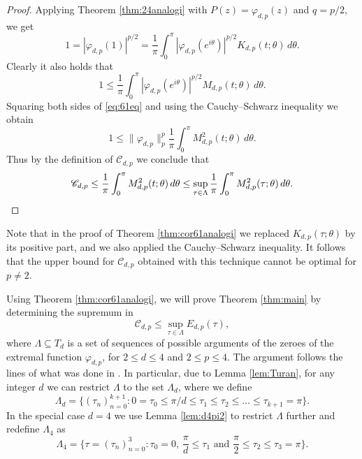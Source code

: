 \documentclass{amsart}
\theoremstyle{plain}
\theoremstyle{remark}
\begin{document}
	\begin{proof}
		Applying Theorem \ref{thm:24analogi} with $P(z)=\varphi_{d,p}(z)$ and $q=p/2$, we get
		\[1=|\varphi_{d,p}(1)|^{p/2}=\frac{1}{\pi} \int_{0}^{\pi}|\varphi_{d,p}(e^{i \theta})|^{p/2} K_{d,p}(t; \theta) \, d \theta.\]
		Clearly it also holds that 
		\begin{equation}\label{eq:61eq}
			1 \leq \frac{1}{\pi} \int_{0}^{\pi}|\varphi_{d,p}(e^{i \theta})|^{p/2} M_{d,p}(t; \theta) \, d \theta.
		\end{equation}
		Squaring both sides of \eqref{eq:61eq} and using the Cauchy--Schwarz inequality we obtain
		\[1 \leq \|\varphi_{d,p}\|_p^p \frac{1}{\pi} \int_{0}^{\pi} M_{d,p}^2(t; \theta) \, d \theta. \]
		Thus by the definition of $\mathscr{C}_{d,p}$ we conclude that 
		\[\mathscr{C}_{d,p} \leq \frac{1}{\pi} \int_{0}^{\pi} M_{d,p}^2(t; \theta) \, d \theta \leq \sup_{\tau \in \Lambda} \frac{1}{\pi} \int_{0}^{\pi} M_{d,p}^2(\tau; \theta) \, d \theta. \qedhere\]
	\end{proof}
	Note that in the proof of Theorem \ref{thm:cor61analogi} we replaced $K_{d,p}(\tau; \theta)$ by its positive part, and we also applied the Cauchy--Schwarz inequality. It follows that the upper bound for $\mathscr{C}_{d,p}$ obtained with this technique cannot be optimal for $p \neq 2$.
	
	Using Theorem \ref{thm:cor61analogi}, we will prove Theorem \ref{thm:main} by determining the supremum in
	\begin{equation}\label{eq:1546}
		\mathscr{C}_{d,p} \leq \sup_{\tau \in \Lambda} E_{d,p}(\tau),
	\end{equation} where $\Lambda \subseteq T_d$ is a set of sequences of possible arguments of the zeroes of the extremal function $\varphi_{d,p}$, for $2 \leq d \leq 4$ and $ 2 \leq p \leq 4$. The argument follows the lines of what was done in \cite{Instanes}. In particular, due to Lemma \ref{lem:Turan}, for any integer $d$ we can restrict $\Lambda$ to the set $\Lambda_d$, where we define
	\begin{equation}\label{eq:Lambdad}
		\Lambda_d=\{(\tau_n)_{n=0}^{k+1}: 0=\tau_0 \leq \pi/d \leq \tau_1 \leq \tau_2 \leq \dots \leq \tau_{k+1} = \pi \}. 
	\end{equation}
	In the special case $d=4$ we use Lemma \ref{lem:d4pi2} to restrict $\Lambda$ further and redefine $\Lambda_4$ as
	\begin{equation}\label{eq:Lambda4}
		\Lambda_4=\{\tau=(\tau_n)_{n=0}^3: \tau_0=0, \, \frac{\pi}{d} \leq \tau_1 \text{ and } \frac{\pi}{2} \leq \tau_2 \leq \tau_3 =\pi\}.
	\end{equation}
	
\end{document}
